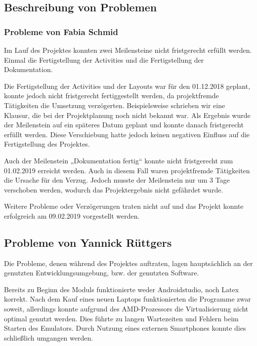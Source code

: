 \newpage
\subsection{Beschreibung von Problemen}
\subsubsection{Probleme von Fabia Schmid}
Im Lauf des Projektes konnten zwei Meilensteine nicht fristgerecht erfüllt werden. Einmal die Fertigstellung der Activities und die Fertigstellung der Dokumentation.
 
Die Fertigstellung der Activities und der Layouts war für den 01.12.2018 geplant, konnte jedoch nicht fristgerecht fertiggestellt werden, da projektfremde Tätigkeiten die Umsetzung verzögerten. Beispielsweise schrieben wir eine Klausur, die bei der Projektplanung noch nicht bekannt war. Als Ergebnis wurde der Meilenstein auf ein späteres Datum geplant und konnte danach fristgerecht erfüllt werden. Diese Verschiebung hatte jedoch keinen negativen Einfluss auf die Fertigstellung des Projektes.

Auch der Meilenstein „Dokumentation fertig“ konnte nicht fristgerecht zum 01.02.2019 erreicht werden. Auch in diesem Fall waren projektfremde Tätigkeiten die Ursache für den Verzug. Jedoch musste der Meilenstein nur um 3 Tage verschoben werden, wodurch das Projektergebnis nicht gefährdet wurde.

Weitere Probleme oder Verzögerungen traten nicht auf und das Projekt konnte erfolgreich am 09.02.2019 vorgestellt werden.

\subsection{Probleme von Yannick Rüttgers}

Die Probleme, denen während des Projektes auftraten, lagen hauptsächlich an der genutzten Entwicklungsumgebung, bzw. der genutzten Software.

Bereits zu Beginn des Moduls funktionierte weder Androidstudio, noch Latex korrekt. Nach dem Kauf eines neuen Laptops funktionierten die Programme zwar soweit, allerdings konnte aufgrund des AMD-Prozessors die Virtualisierung nicht optimal genutzt werden. Dies führte zu langen Wartezeiten und Fehlern beim Starten des Emulators. Durch Nutzung eines externen Smartphones konnte dies schließlich umgangen werden.



